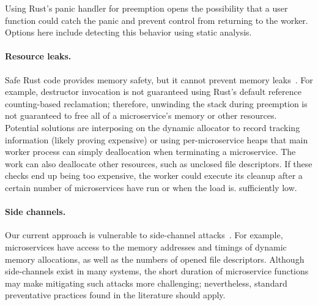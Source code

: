 Using Rust's panic handler for preemption opens the possibility that a user
function could catch the panic and prevent control from returning to the
worker. Options here include detecting this behavior using static analysis.


\paragraph{Resource leaks.}
Safe Rust code provides memory safety, but it cannot prevent memory
leaks~\cite{www-rustlang-nu}.  For example, destructor invocation is not
guaranteed using Rust's default reference counting-based reclamation; therefore,
unwinding the stack during preemption is not guaranteed to free all of a
microservice's memory or other resources.  Potential solutions are interposing
on the dynamic allocator to record tracking information (likely proving
expensive) or using per-microservice heaps that main worker process can simply
deallocation when terminating a microservice.  The work can also deallocate
other resources, such as unclosed file descriptors.  If these checks end up
being too expensive, the worker could execute its cleanup after a certain number
of microservices have run or when the load is. sufficiently low.

\paragraph{Side channels.}
Our current approach is vulnerable to side-channel
attacks~\cite{Lipp2018,Kocher2018}.  For example, microservices have access to
the memory addresses and timings of dynamic memory allocations, as well as the
numbers of opened file descriptors.  Although side-channels exist in many
systems, the short duration of microservice functions may
make mitigating such attacks more challenging; nevertheless, standard
preventative practices found in the literature should apply.

